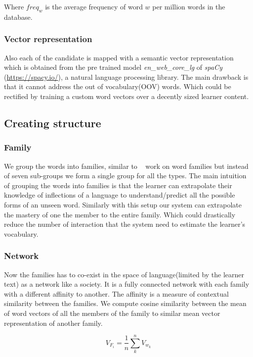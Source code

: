 \documentclass[11pt,a4paper]{article}
\begin{document}
Where ${freq_w}$ is the average frequency of word $w$ per million words in the
database.

\subsubsection{Vector representation}
Also each of the candidate is mapped with a semantic vector representation which
is obtained from the pre trained model \emph{en\_web\_core\_lg} of \emph{spaCy}
(\url{https://spacy.io/}), a natural language processing library. The main
drawback is that it cannot address the out of vocabulary(OOV) words. Which
could be rectified by training a custom word vectors over a decently sized learner content.

\subsection{Creating structure}

\subsubsection{Family}
We group the words into families, similar to ~\citet{bauer1993word} work on word
families but instead of seven sub-groups we form a single group for all the types.
The main intuition of grouping the words into families is that the learner can
extrapolate their knowledge of inflections of a language to understand/predict
all the possible forms of an unseen word. Similarly with this setup our system
can extrapolate the mastery of one the member to the entire family. Which could 
drastically reduce the number of interaction that the system need to estimate
the learner's vocabulary.

\subsubsection{Network}
Now the families has to co-exist in the space of language(limited by the
learner text) as a network like a society. It is a fully connected network with each
family with a different affinity to another. The affinity is a measure of
contextual similarity between the families. We compute cosine similarity 
between the mean of word vectors of all the members of the family to similar
mean vector representation of another family.

\begin{equation}
  V_{F_i} = \frac{1}{n} \sum_{k}^{n} V_{w_k}
\end{equation}
\end{document}
